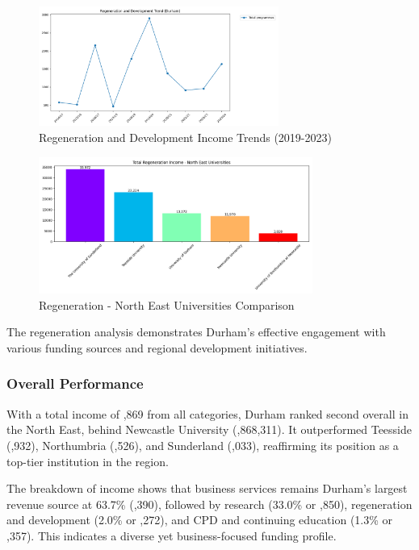 \documentclass[journal,onecolumn, 10pt,draftclsnofoot]{IEEEtran}
\begin{document}
\begin{figure}[h]
\centering
\includegraphics[width=0.7\textwidth]{Fig/figure15.regeneration_time_trend.png}
\caption{Regeneration and Development Income Trends (2019-2023)}
\label{fig:regeneration-time-trend}
\end{figure}

\begin{figure}[h]
\centering
\includegraphics[width=0.8\textwidth]{Fig/figure16.regeneration_ne_comparison.png}
\caption{Regeneration - North East Universities Comparison}
\label{fig:regeneration-ne-comparison}
\end{figure}

The regeneration analysis demonstrates Durham's effective engagement with various funding sources and regional development initiatives.

\subsubsection{Overall Performance}

With a total income of ,869 from all categories, Durham ranked second overall in the North East, behind Newcastle University (,868,311). It outperformed Teesside (,932), Northumbria (,526), and Sunderland (,033), reaffirming its position as a top-tier institution in the region.

The breakdown of income shows that business services remains Durham's largest revenue source at 63.7\% (,390), followed by research (33.0\% or ,850), regeneration and development (2.0\% or ,272), and CPD and continuing education (1.3\% or ,357). This indicates a diverse yet business-focused funding profile.
\end{document}
